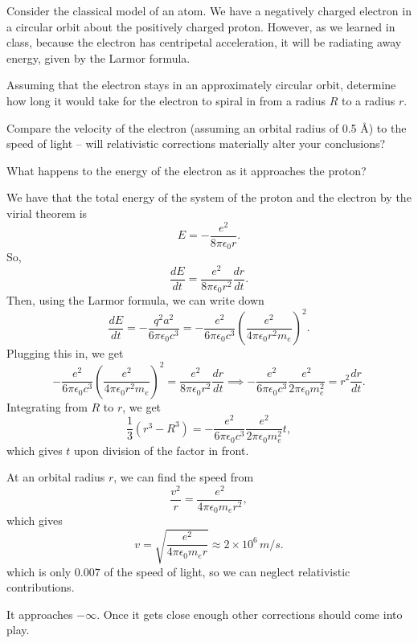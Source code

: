 \documentclass[11pt]{scrartcl}
\begin{document}
\begin{prob}
    Consider the classical model of an atom. We have a negatively charged electron in a circular orbit about the positively charged proton. However, as we learned in class, because the electron has centripetal acceleration, it will be radiating away energy, given by the Larmor formula.
    \begin{anum}
        \item Assuming that the electron stays in an approximately circular orbit, determine how long it would take for the electron to spiral in from a radius $R$ to a radius $r$.
        \item Compare the velocity of the electron (assuming an orbital radius of 0.5 \AA) to the
speed of light – will relativistic corrections materially alter your conclusions?
\item What happens to the energy of the electron as it approaches the proton?
    \end{anum}
\end{prob}
\begin{alphasol}
    \item We have that the total energy of the system of the proton and the electron by the virial theorem is
    $$E = -\frac{e^2}{8\pi \epsilon_0 r}.$$
    So,
    $$\frac{dE}{dt} = \frac{e^2}{8\pi \epsilon_0 r^2}\frac{dr}{dt}.$$
    Then, using the Larmor formula, we can write down 
    $$\frac{dE}{dt} = -\frac{q^2a^2}{6\pi \epsilon_0 c^3} =-\frac{e^2}{6\pi\epsilon_0 c^3} \left(\frac{e^2}{4\pi \epsilon_0 r^2m_e}\right)^2 .$$
    Plugging this in, we get
    $$-\frac{e^2}{6\pi\epsilon_0 c^3} \left(\frac{e^2}{4\pi \epsilon_0 r^2m_e}\right)^2 = \frac{e^2}{8\pi\epsilon_0 r^2}\frac{dr}{dt} \implies -\frac{e^2}{6\pi\epsilon_0 c^3}\frac{e^2}{2\pi \epsilon_0m_e^2} = r^2\frac{dr}{dt} .$$
    Integrating from $R$ to $r$, we get
    $$\frac 13 (r^3 - R^3) = -\frac{e^2}{6\pi\epsilon_0 c^3}\frac{e^2}{2\pi \epsilon_0m_e^2}t,$$
    which gives $t$ upon division of the factor in front.
    \item At an orbital radius $r$, we can find the speed from
    $$\frac{v^2}{r} = \frac{e^2}{4\pi \epsilon_0 m_e r^2},$$
    which gives 
    $$v = \sqrt{\frac{e^2}{4\pi\epsilon_0 m_e r}} \approx 2 \times 10^6 \,\unit{m/s}.$$
    which is only $0.007$ of the speed of light, so we can neglect relativistic contributions.
    \item It approaches $-\infty$. Once it gets close enough other corrections should come into play. 
\end{alphasol}
\end{document}
